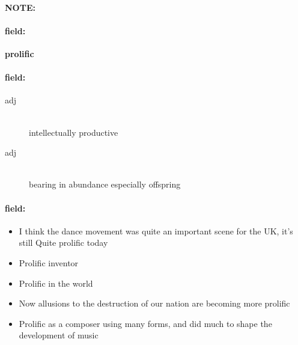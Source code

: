 \documentclass[12pt]{article}
\newenvironment{note}{\paragraph{NOTE:}}{}
\newenvironment{field}{\paragraph{field:}}{}
\begin{document}
\begin{note}
\begin{field}
\textbf{\large prolific}
\end{field}


\begin{field}
\begin{description}
\item[adj] \hfill \\ 
intellectually productive

\item[adj] \hfill \\ 
bearing in abundance especially offspring

\end{description}
\end{field}

\begin{field}
\begin{itemize}
\item I think the dance movement was quite an important scene for the UK, it's still Quite prolific today
\item Prolific inventor
\item Prolific in the world
\item Now allusions to the destruction of our nation are becoming more prolific
\item Prolific as a composer using many forms, and did much to shape the development of music
\end{itemize}
\end{field}
\end{note}
\end{document}
